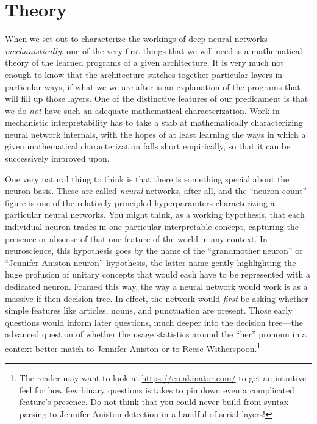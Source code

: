 \section{Theory}
When we set out to characterize the workings of deep neural networks
\emph{mechanistically}, one of the very first things that we will need is a
mathematical theory of the learned programs of a given architecture. It is very
much not enough to know that the architecture stitches together particular
layers in particular ways, if what we we are after is an explanation of the
programs that will fill up those layers. One of the distinctive features of our
predicament is that we do \emph{not} have such an adequate mathematical
characterization. Work in mechanistic interpretability has to take a stab at
mathematically characterizing neural network internals, with the hopes of at
least learning the ways in which a given mathematical characterization falls
short empirically, so that it can be successively improved upon.

One very natural thing to think is that there is something special about the
neuron basis. These are called \emph{neural} networks, after all, and the
``neuron count'' figure is one of the relatively principled hyperparamters
characterizing a particular neural networks. You might think, as a working
hypothesis, that each individual neuron trades in one particular interpretable
concept, capturing the presence or absense of that one feature of the world in
any context. In neuroscience, this hypothesis goes by the name of the
``grandmother neuron'' or ``Jennifer Aniston neuron'' hypothesis, the latter
name gently highlighting the huge profusion of unitary concepts that would each
have to be represented with a dedicated neuron. Framed this way, the way a
neural network would work is as a massive if-then decision tree. In effect, the
network would \emph{first} be asking whether simple features like articles,
nouns, and punctuation are present. Those early questions would inform later
questions, much deeper into the decision tree---the advanced question of
whether the usage statistics around the ``her'' pronoun in a context better
match to Jennifer Aniston or to Reese Witherspoon.\footnote{The reader may want
to look at \url{https://en.akinator.com/} to get an intuitive feel for how few
binary questions is takes to pin down even a complicated feature's presence. Do
not think that you could never build from syntax parsing to Jennifer Aniston
detection in a handful of serial layers!}

